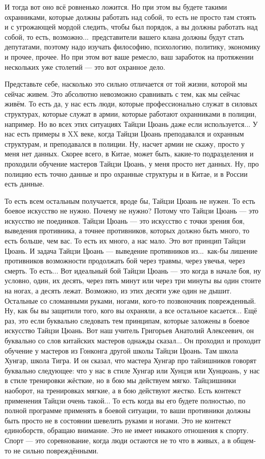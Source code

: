 И тогда вот оно 
всё ровненько ложится. Но при этом вы будете такими 
охранниками, которые должны работать над собой, то 
есть не просто там стоять и с угрожающей мордой
следить, чтобы был порядок, а вы должны
работать над собой, то есть, возможно...\ представители 
вашего клана должны будут стать депутатами, поэтому 
надо изучать философию, психологию, политику,  
экономику и прочее, прочее.  Но при этом вот ваше 
ремесло, ваш заработок на протяжении нескольких уже 
столетий --- это вот охранное дело.

Представьте себе,  
насколько это сильно отличается от той жизни, которой 
мы сейчас живем. Это абсолютно невозможно сравнивать 
с тем, как мы сейчас живём.  То есть да, у нас есть люди, 
которые профессионально служат в силовых структурах,  
которые служат в армии, которые работают охранниками 
в полиции, например. Но во всех этих ситуациях Тайцзи 
Цюань даже если используется... У нас есть примеры в XX 
веке, когда Тайцзи Цюань преподавался и охранным 
структурам,  и преподавался в полиции.  Ну, насчет 
армии не скажу, просто у меня нет данных. Скорее всего, 
в Китае, может быть, какие-то подразделения и 
проходили обучение мастеров Тайцзи Цюань, у меня 
просто нет данных. Ну, про полицию есть точно данные и 
про охранные структуры и в Китае, и в России есть 
данные.

То есть всем остальным получается, вроде бы, 
Тайцзи Цюань не нужен.  То есть боевое искусство не 
нужно. Почему не нужно? Потому что Тайцзи Цюань --- это 
искусство не поединков. Тайцзи Цюань --- это искусство 
с точки зрения боя, выведения противника, а точнее 
противников, которых должно быть много, то есть 
больше,  чем вас.  То есть их много, а нас мало. Это вот 
принцип Тайцзи Цюань.  И задача Тайцзи Цюань --- 
выведение противников из...\ как-бы лишение противников 
возможности продолжать бой через травмы, через 
увечья, через смерть. То есть... Вот идеальный бой Тайцзи Цюань
--- это когда в начале боя, ну условно,  один, их 
десять, через пять минут или через три минуты вы один 
стоите на ногах, а десять лежат. Возможно, из этих 
десяти уже один не дышит. Остальные со сломанными 
руками, ногами, кого-то позвоночник поврежденный.  Ну, 
как бы вы защитили того, кого вы охраняли, а все 
остальное касается... Ещё раз, это если буквально 
следовать тем принципам, которые заложены в боевое 
искусство Тайцзи Цюань. Вот наш учитель Григорьев 
Анатолий Алексеевич, он буквально со слов китайских 
мастеров однажды сказал... Он проходил и проходит 
обучение у мастеров из Гонконга другой школы Тайцзи Цюань.
Там школа Хунгар, школа Тигра. И он сказал, что 
мастера Хунгар про тайзишников говорят буквально 
следующее: что у нас в стиле Хунгар или Хунцзя или
Хунцюань, у нас в стиле тренировки жёсткие, но 
в бою мы действуем мягко. Тайцзишники наоборот, на 
тренировках мягкие, а в бою действуют жестко. Есть 
контекст применения Тайцзи очень такой... То есть 
когда вы его будете полностью, по полной программе 
применять в боевой ситуации, то ваши противники 
должны быть просто не в состоянии шевелить руками и 
ногами. Это не контекст единоборств, обращаю внимание. 
Это не имеет никакого отношения к спорту. Спорт --- это 
соревнование, когда люди остаются не то что в живых, а 
в общем-то не сильно повреждёнными.

